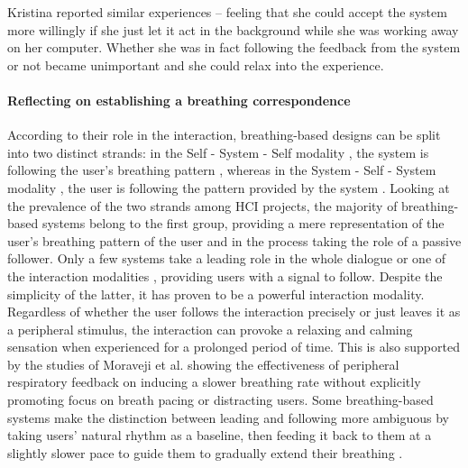 Kristina reported similar experiences -- feeling that she could accept the system more willingly if she just let it act in the background while she was working away on her computer. Whether she was in fact following the feedback from the system or not became unimportant and she could relax into the experience.

\paragraph{Reflecting on establishing a breathing correspondence}

According to their role in the interaction, breathing-based designs can be split into two distinct strands: in the Self - System - Self modality \cite{prpa_inhaling_2020}, the system is following the user's breathing pattern \cite{abushakra_augmenting_2014, sonne_chillfish_2016, bingham_breath_2010, roo_inner_2017, prpa_hacking_2016, shaw_meditation_2007, aslan_hold_2016, pisa_towards_2017, sjoman_breathing_2018, moran_exopranayama_2016}, whereas in the System - Self - System modality \cite{prpa_inhaling_2020}, the user is following the pattern provided by the system \cite{wongsuphasawat_you_2012, yu_breathe_2015, soyka_enhancing_2016, dijk_breathe_2011}. Looking at the prevalence of the two strands among HCI projects, the majority of breathing-based systems belong to the first group, providing a mere representation of the user's breathing pattern of the user and in the process taking the role of a passive follower. Only a few systems take a leading role in the whole dialogue \cite{wongsuphasawat_you_2012, yu_breathe_2015, soyka_enhancing_2016} or one of the interaction modalities \cite{bumatay_investigating_2017, patibanda_life_2017}, providing users with a signal to follow. Despite the simplicity of the latter, it has proven to be a powerful interaction modality. Regardless of whether the user follows the interaction precisely or just leaves it as a peripheral stimulus, the interaction can provoke a relaxing and calming sensation when experienced for a prolonged period of time. This is also supported by the studies of Moraveji et al. \cite{moraveji_peripheral_2011, moraveji_breathtray_2012} showing the effectiveness of peripheral respiratory feedback on inducing a slower breathing rate without explicitly promoting focus on breath pacing or distracting users. Some breathing-based systems make the distinction between leading and following more ambiguous by taking users' natural rhythm as a baseline, then feeding it back to them at a slightly slower pace to guide them to gradually extend their breathing \cite{moraveji_peripheral_2011, ghandeharioun_brightbeat_2017}.

